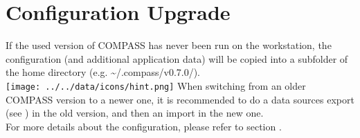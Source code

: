 
\section{Configuration Upgrade}

If the used version of COMPASS has never been run on the workstation, the configuration (and additional application data) will be copied into a subfolder of the home directory (e.g. \textasciitilde/.compass/v0.7.0/). \\

\texttt{[image: ../../data/icons/hint.png]} When switching from an older COMPASS version to a newer one, it is recommended to do a data sources export (see ) in the old version, 
and then an import in the new one. \\

For more details about the configuration, please refer to section .
